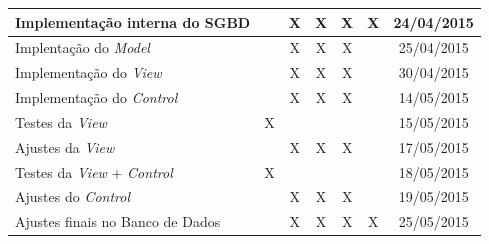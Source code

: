 \documentclass[a4paper,12pt]{article}
\begin{document}
{\begin{longtable}{|p{3cm}|c|c|c|c|c|c|}
Implementação interna do SGBD             &                                          & X                                      & X                                     & X                                      & X                                     & 24/04/2015                                \\ \hline
Implentação do \textit{Model}                      &                                          & X                                      & X                                     & X                                      &                                       & 25/04/2015                                \\ \hline
Implementação do \textit{View}                     &                                          & X                                      & X                                     & X                                      &                                       & 30/04/2015                                \\ \hline
Implementação do \textit{Control}                  &                                          & X                                      & X                                     & X                                      &                                       & 14/05/2015                                \\ \hline
Testes da \textit{View}                            & X                                        &                                        &                                       &                                        &                                       & 15/05/2015                                \\ \hline
Ajustes da \textit{View}                           &                                          & X                                      & X                                     & X                                      &                                       & 17/05/2015                                \\ \hline
Testes da \textit{View} + \textit{Control}                  & X                                        &                                        &                                       &                                        &                                       & 18/05/2015                                \\ \hline
Ajustes do \textit{Control}                        &                                          & X                                      & X                                     & X                                      &                                       & 19/05/2015                                \\ \hline
Ajustes finais no Banco de Dados          &                                          & X                                      & X                                     & X                                      & X                                     & 25/05/2015                                \\ \hline


\end{longtable}}
\end{document}

